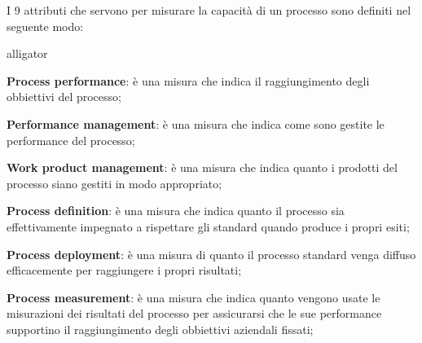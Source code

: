 I 9 attributi che servono per misurare la capacità di un processo sono definiti nel seguente modo:
\begin{labeling}{alligator}
	\item \textbf{Process performance}:  è una misura che indica il raggiungimento degli obbiettivi del processo;
	
	\item \textbf{Performance management}: è una misura che indica come sono gestite le performance del processo;%
	\item \textbf{Work product management}: è una misura che indica quanto i prodotti del processo siano gestiti in modo appropriato;
	
	\item \textbf{Process definition}: è una misura che indica quanto il processo sia effettivamente impegnato a rispettare gli standard quando produce i propri esiti;
	
	\item \textbf{Process deployment}: è una misura di quanto il processo standard venga diffuso efficacemente per raggiungere i propri risultati;%
	\item \textbf{Process measurement}:  è una misura che indica quanto vengono usate le misurazioni dei risultati  del processo per assicurarsi che le sue  performance supportino il raggiungimento degli obbiettivi aziendali fissati;
	

\end{labeling}
